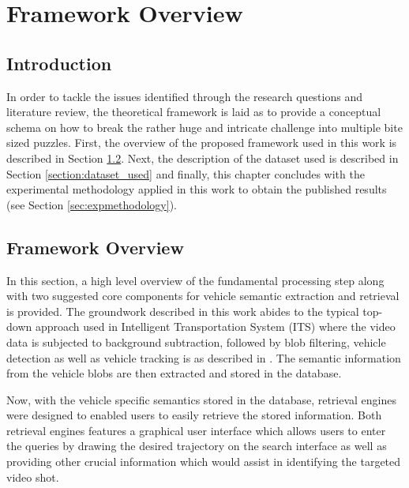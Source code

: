 \chapter{Framework Overview}

\section{Introduction}
In order to tackle the issues identified through the research questions and literature review, the theoretical framework is laid as to provide a conceptual schema on how to break the rather huge and intricate challenge into multiple bite sized puzzles. First, the overview of the proposed framework used in this work is described in Section \ref{section:framework}. Next, the description of the dataset used is described in Section \ref{section:dataset_used} and finally, this chapter concludes with the experimental methodology applied in this work to obtain the published results (see Section \ref{sec:expmethodology}). 



\section{Framework Overview}
\label{section:framework}
In this section, a high level overview of the fundamental processing step along with two suggested core components for vehicle semantic extraction and retrieval is provided. The groundwork described in this work abides to the typical top-down approach used in Intelligent Transportation System (ITS) where the video data is subjected to background subtraction, followed by blob filtering, vehicle detection as well as vehicle tracking is as described in \cite{lim2017}. The semantic information from the vehicle blobs are then extracted and stored in the database. 

Now, with the vehicle specific semantics stored in the database, retrieval engines were designed to enabled users to easily retrieve the stored information. Both retrieval engines features a graphical user interface which allows users to enter the queries by drawing the desired trajectory on the search interface as well as providing other crucial information which would assist in identifying the targeted video shot.


